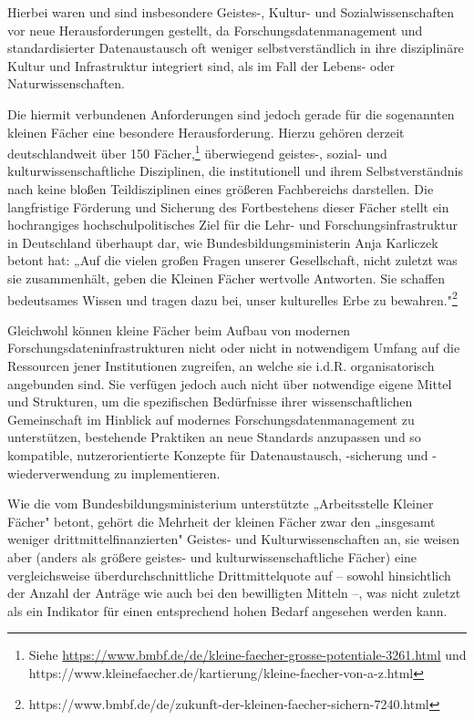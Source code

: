Hierbei waren und sind insbesondere Geistes-, Kultur- und
Sozialwissenschaften vor neue Herausforderungen gestellt, da
Forschungsdatenmanagement und standardisierter Datenaustausch oft
weniger selbstverständlich in ihre disziplinäre Kultur und Infrastruktur
integriert sind, als im Fall der Lebens- oder Naturwissenschaften.

Die hiermit verbundenen Anforderungen sind jedoch gerade für die
sogenannten kleinen Fächer eine besondere Herausforderung. Hierzu
gehören derzeit deutschlandweit über 150 Fächer,\footnote{Siehe
  \url{https://www.bmbf.de/de/kleine-faecher-grosse-potentiale-3261.html}
  und
  https://www.kleinefaecher.de/kartierung/kleine-faecher-von-a-z.html}
überwiegend geistes-, sozial- und kulturwissenschaftliche Disziplinen,
die institutionell und ihrem Selbstverständnis nach keine bloßen
Teildisziplinen eines größeren Fachbereichs darstellen. Die langfristige
Förderung und Sicherung des Fortbestehens dieser Fächer stellt ein
hochrangiges hochschulpolitisches Ziel für die Lehr- und
Forschungsinfrastruktur in Deutschland überhaupt dar, wie
Bundesbildungsministerin Anja Karliczek betont hat: „Auf die vielen
großen Fragen unserer Gesellschaft, nicht zuletzt was sie zusammenhält,
geben die Kleinen Fächer wertvolle Antworten. Sie schaffen bedeutsames
Wissen und tragen dazu bei, unser kulturelles Erbe zu
bewahren."\footnote{https://www.bmbf.de/de/zukunft-der-kleinen-faecher-sichern-7240.html}

Gleichwohl können kleine Fächer beim Aufbau von modernen
Forschungsdateninfrastrukturen nicht oder nicht in notwendigem Umfang
auf die Ressourcen jener Institutionen zugreifen, an welche sie i.d.R.
organisatorisch angebunden sind. Sie verfügen jedoch auch nicht über
notwendige eigene Mittel und Strukturen, um die spezifischen Bedürfnisse
ihrer wissenschaftlichen Gemeinschaft im Hinblick auf modernes
Forschungsdatenmanagement zu unterstützen, bestehende Praktiken an neue
Standards anzupassen und so kompatible, nutzerorientierte Konzepte für
Datenaustausch, -sicherung und -wiederverwendung zu implementieren.

Wie die vom Bundesbildungsministerium unterstützte „Arbeitsstelle
Kleiner Fächer" betont, gehört die Mehrheit der kleinen Fächer zwar den
„insgesamt weniger drittmittelfinanzierten" Geistes- und
Kulturwissenschaften an, sie weisen aber (anders als größere geistes-
und kulturwissenschaftliche Fächer) eine vergleichsweise
überdurchschnittliche Drittmittelquote auf -- sowohl hinsichtlich der
Anzahl der Anträge wie auch bei den bewilligten Mitteln --, was nicht
zuletzt als ein Indikator für einen entsprechend hohen Bedarf angesehen
werden kann.

